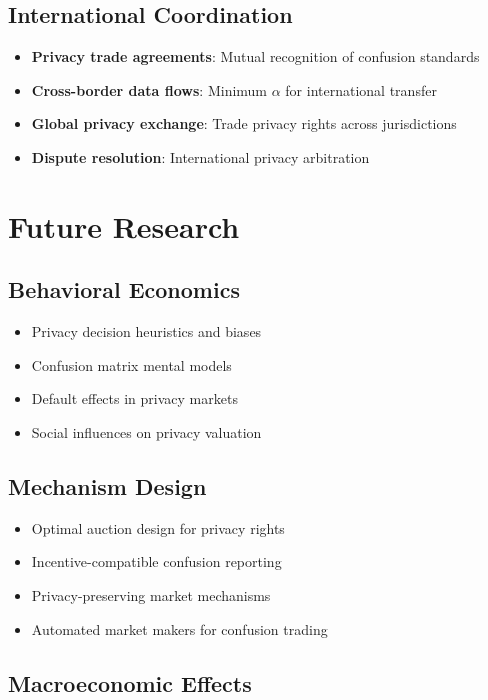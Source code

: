 \documentclass[11pt,final]{article}
\begin{document}
\subsection{International Coordination}

\begin{itemize}
    \item \textbf{Privacy trade agreements}: Mutual recognition of confusion standards
    \item \textbf{Cross-border data flows}: Minimum $\alpha$ for international transfer
    \item \textbf{Global privacy exchange}: Trade privacy rights across jurisdictions
    \item \textbf{Dispute resolution}: International privacy arbitration
\end{itemize}

\section{Future Research}

\subsection{Behavioral Economics}

\begin{itemize}
    \item Privacy decision heuristics and biases
    \item Confusion matrix mental models
    \item Default effects in privacy markets
    \item Social influences on privacy valuation
\end{itemize}

\subsection{Mechanism Design}

\begin{itemize}
    \item Optimal auction design for privacy rights
    \item Incentive-compatible confusion reporting
    \item Privacy-preserving market mechanisms
    \item Automated market makers for confusion trading
\end{itemize}

\subsection{Macroeconomic Effects}
\end{document}

